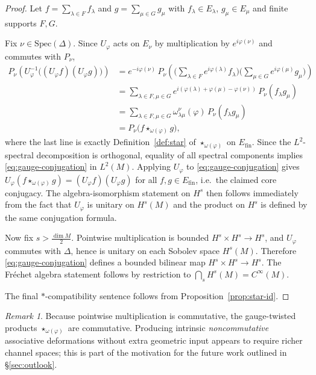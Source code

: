 \documentclass[11pt]{amsart}
\theoremstyle{plain}
\theoremstyle{definition}
\theoremstyle{remark}
\newtheorem{remark}[theorem]{Remark}
\newcommand{\Spec}{\mathrm{Spec}}
\begin{document}
\begin{proof}
Let $f=\sum_{\lambda\in F} f_\lambda$ and $g=\sum_{\mu\in G} g_\mu$ with $f_\lambda\in E_\lambda$, $g_\mu\in E_\mu$ and
finite supports $F,G$.

Fix $\nu\in\Spec(\Delta)$. Since $U_\varphi$ acts on $E_\nu$ by multiplication by $e^{i\varphi(\nu)}$ and commutes with $P_\nu$,
\begin{align*}
P_\nu\!\left(U_\varphi^{-1}\big((U_\varphi f)(U_\varphi g)\big)\right)
&= e^{-i\varphi(\nu)}\,P_\nu\!\left(\Big(\sum_{\lambda\in F}e^{i\varphi(\lambda)}f_\lambda\Big)
\Big(\sum_{\mu\in G}e^{i\varphi(\mu)}g_\mu\Big)\right)\\
&= \sum_{\lambda\in F,\mu\in G} e^{i(\varphi(\lambda)+\varphi(\mu)-\varphi(\nu))}\,P_\nu(f_\lambda g_\mu)\\
&= \sum_{\lambda\in F,\mu\in G} \omega^{\nu}_{\lambda\mu}(\varphi)\,P_\nu(f_\lambda g_\mu)\\
&= P_\nu\big(f\star_{\omega(\varphi)} g\big),
\end{align*}
where the last line is exactly Definition~\ref{def:star} of $\star_{\omega(\varphi)}$ on $E_{\mathrm{fin}}$.
Since the $L^2$-spectral decomposition is orthogonal, equality of all spectral components implies \eqref{eq:gauge-conjugation} in $L^2(M)$.
Applying $U_\varphi$ to \eqref{eq:gauge-conjugation} gives
$U_\varphi(f\star_{\omega(\varphi)} g)=(U_\varphi f)(U_\varphi g)$ for all $f,g\in E_{\mathrm{fin}}$,
i.e.\ the claimed core conjugacy.
The algebra-isomorphism statement on $H^s$ then follows immediately from the fact that $U_\varphi$
is unitary on $H^s(M)$ and the product on $H^s$ is defined by the same conjugation formula.

Now fix $s>\frac{\dim M}{2}$. Pointwise multiplication is bounded $H^s\times H^s\to H^s$, and $U_\varphi$ commutes with $\Delta$,
hence is unitary on each Sobolev space $H^s(M)$. Therefore \eqref{eq:gauge-conjugation} defines a bounded bilinear map
$H^s\times H^s\to H^s$. The Fr\'echet algebra statement follows by restriction to $\bigcap_s H^s(M)=C^\infty(M)$.

The final $*$-compatibility sentence follows from Proposition~\ref{prop:star-id}.
\end{proof}

\begin{remark} Because pointwise multiplication is commutative, the gauge-twisted products $\star_{\omega(\varphi)}$ are commutative.
Producing intrinsic \emph{noncommutative} associative deformations without extra geometric input
appears to require richer channel spaces; this is part of the motivation for the future work outlined in \S\ref{sec:outlook}.
\end{remark}
\end{document}
